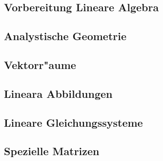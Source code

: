 \subsection{Vorbereitung Lineare Algebra}

\subsection{Analystische Geometrie}

\subsection{Vektorr"aume}

\subsection{Lineara Abbildungen}

\subsection{Lineare Gleichungssysteme}

\subsection{Spezielle Matrizen}